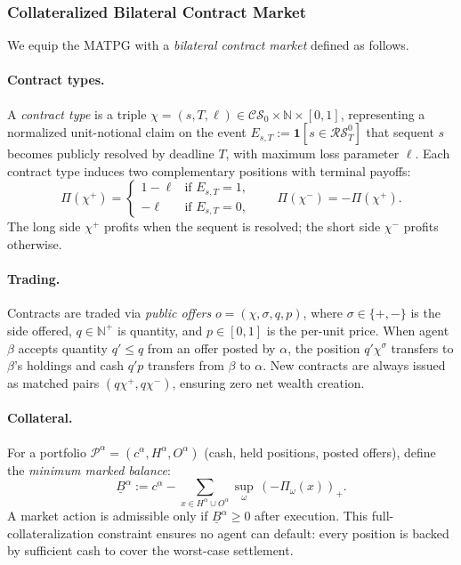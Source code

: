 \subsubsection{Collateralized Bilateral Contract Market}\label{sec:contract-market}

We equip the MATPG with a \emph{bilateral contract market} defined as follows.

\paragraph{Contract types.}
A \emph{contract type} is a triple $\chi = (s, T, \ell) \in \mathcal{CS}_0 \times \mathbb{N} \times [0,1]$, representing a normalized unit-notional claim on the event $E_{s,T} := \mathbf{1}[s\in\mathcal{RS}^0_T]$ that sequent $s$ becomes publicly resolved by deadline $T$, with maximum loss parameter $\ell$. Each contract type induces two complementary positions with terminal payoffs:
\[
\Pi(\chi^+) = \begin{cases} 1-\ell & \text{if } E_{s,T}=1, \\ -\ell & \text{if } E_{s,T}=0, \end{cases}
\qquad
\Pi(\chi^-) = -\Pi(\chi^+).
\]
The long side $\chi^+$ profits when the sequent is resolved; the short side $\chi^-$ profits otherwise.

\paragraph{Trading.}
Contracts are traded via \emph{public offers} $o = (\chi, \sigma, q, p)$, where $\sigma\in\{+,-\}$ is the side offered, $q\in\mathbb{N}^+$ is quantity, and $p\in[0,1]$ is the per-unit price. When agent $\beta$ accepts quantity $q'\le q$ from an offer posted by $\alpha$, the position $q'\chi^\sigma$ transfers to $\beta$'s holdings and cash $q'p$ transfers from $\beta$ to $\alpha$. New contracts are always issued as matched pairs $(q\chi^+, q\chi^-)$, ensuring zero net wealth creation.

\paragraph{Collateral.}
For a portfolio $\mathcal{P}^\alpha = (c^\alpha, H^\alpha, O^\alpha)$ (cash, held positions, posted offers), define the \emph{minimum marked balance}:
\[
\underline{B}^\alpha := c^\alpha - \sum_{x\in H^\alpha\cup O^\alpha} \sup_\omega\,(-\Pi_\omega(x))_+.
\]
A market action is admissible only if $\underline{B}^\alpha \ge 0$ after execution. This full-collateralization constraint ensures no agent can default: every position is backed by sufficient cash to cover the worst-case settlement.

